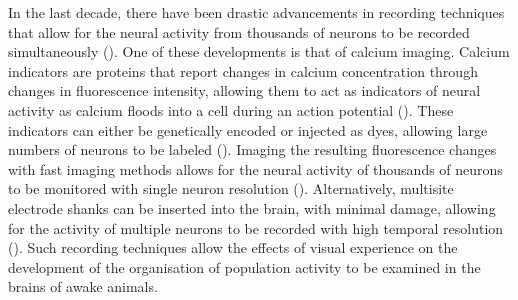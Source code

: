 In the last decade, there have been drastic advancements in recording techniques that allow for the neural activity from thousands of neurons to be recorded simultaneously (\cite{Broussard2014MonitoringIndicators, Jun2017FullyActivity,Nicolelis2003ChronicMonkeys}). One  of these developments is that of calcium imaging.  Calcium indicators are proteins that report changes in calcium concentration through changes in fluorescence intensity,  allowing them to act as indicators of neural activity as calcium floods into a cell during an action potential (\cite{Akerboom2013GeneticallyOptogenetics}). These indicators can either be genetically encoded or injected as dyes, allowing large numbers of neurons to be labeled (\cite{Dunfield2010InBrain., Tian2012ImagingIndicators}). Imaging the resulting fluorescence changes with fast imaging methods allows for the neural activity of thousands of neurons to be monitored with single neuron resolution (\cite{Ahrens2013, Sofroniew2016AImaging}). Alternatively, multisite electrode shanks can be inserted into the brain, with minimal damage, allowing for the activity of multiple neurons to be recorded with high temporal resolution (\cite{Jun2017FullyActivity, Nicolelis2003ChronicMonkeys}). Such recording techniques allow the effects of visual experience on the development of the organisation of population activity to be examined in the brains of awake animals.

